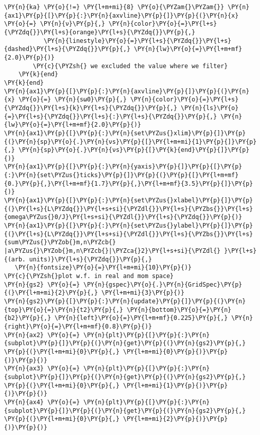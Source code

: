 \begin{Verbatim}[commandchars=\\\{\}]
        \PY{n}{ka} \PY{o}{!=} \PY{l+m+mi}{8} \PY{o}{\PYZam{}\PYZam{}} \PY{n}{ax1}\PY{p}{[}\PY{p}{:}\PY{n}{axvline}\PY{p}{]}\PY{p}{(}\PY{n}{x} \PY{o}{=} \PY{n}{ν}\PY{p}{,} \PY{n}{color}\PY{o}{=}\PY{l+s}{\PYZdq{}}\PY{l+s}{orange}\PY{l+s}{\PYZdq{}}\PY{p}{,}
           \PY{n}{linestyle}\PY{o}{=}\PY{l+s}{\PYZdq{}}\PY{l+s}{dashed}\PY{l+s}{\PYZdq{}}\PY{p}{,} \PY{n}{lw}\PY{o}{=}\PY{l+m+mf}{2.0}\PY{p}{)}
        \PY{c}{\PYZsh{} we excluded the value where we filter}
    \PY{k}{end}
\PY{k}{end}
\PY{n}{ax1}\PY{p}{[}\PY{p}{:}\PY{n}{axvline}\PY{p}{]}\PY{p}{(}\PY{n}{x} \PY{o}{=} \PY{n}{sω0}\PY{p}{,} \PY{n}{color}\PY{o}{=}\PY{l+s}{\PYZdq{}}\PY{l+s}{k}\PY{l+s}{\PYZdq{}}\PY{p}{,} \PY{n}{ls}\PY{o}{=}\PY{l+s}{\PYZdq{}}\PY{l+s}{:}\PY{l+s}{\PYZdq{}}\PY{p}{,} \PY{n}{lw}\PY{o}{=}\PY{l+m+mf}{2.0}\PY{p}{)}
\PY{n}{ax1}\PY{p}{[}\PY{p}{:}\PY{n}{set\PYZus{}xlim}\PY{p}{]}\PY{p}{(}\PY{n}{sp}\PY{o}{.}\PY{n}{νs}\PY{p}{[}\PY{l+m+mi}{1}\PY{p}{]}\PY{p}{,} \PY{n}{sp}\PY{o}{.}\PY{n}{νs}\PY{p}{[}\PY{k}{end}\PY{p}{]}\PY{p}{)}
\PY{n}{ax1}\PY{p}{[}\PY{p}{:}\PY{n}{yaxis}\PY{p}{]}\PY{p}{[}\PY{p}{:}\PY{n}{set\PYZus{}ticks}\PY{p}{]}\PY{p}{(}\PY{p}{[}\PY{l+m+mf}{0.}\PY{p}{,}\PY{l+m+mf}{1.7}\PY{p}{,}\PY{l+m+mf}{3.5}\PY{p}{]}\PY{p}{)}
\PY{n}{ax1}\PY{p}{[}\PY{p}{:}\PY{n}{set\PYZus{}xlabel}\PY{p}{]}\PY{p}{(}\PY{l+s}{L\PYZdq{}}\PY{l+s+si}{\PYZdl{}}\PY{l+s}{\PYZbs{}}\PY{l+s}{omega\PYZus{}0/J}\PY{l+s+si}{\PYZdl{}}\PY{l+s}{\PYZdq{}}\PY{p}{)}
\PY{n}{ax1}\PY{p}{[}\PY{p}{:}\PY{n}{set\PYZus{}ylabel}\PY{p}{]}\PY{p}{(}\PY{l+s}{L\PYZdq{}}\PY{l+s+si}{\PYZdl{}}\PY{l+s}{\PYZbs{}}\PY{l+s}{sum\PYZus{}\PYZob{}m,n\PYZcb{} |a\PYZus{}\PYZob{}m,n\PYZcb{}|\PYZca{}2}\PY{l+s+si}{\PYZdl{} }\PY{l+s}{(arb. units)}\PY{l+s}{\PYZdq{}}\PY{p}{,}
   \PY{n}{fontsize}\PY{o}{=}\PY{l+m+mi}{10}\PY{p}{)}
\PY{c}{\PYZsh{}plot w.f. in real and mom space}
\PY{n}{gs2} \PY{o}{=} \PY{n}{gspec}\PY{o}{.}\PY{n}{GridSpec}\PY{p}{(}\PY{l+m+mi}{2}\PY{p}{,} \PY{l+m+mi}{3}\PY{p}{)}
\PY{n}{gs2}\PY{p}{[}\PY{p}{:}\PY{n}{update}\PY{p}{]}\PY{p}{(}\PY{n}{top}\PY{o}{=}\PY{n}{t2}\PY{p}{,} \PY{n}{bottom}\PY{o}{=}\PY{n}{b2}\PY{p}{,} \PY{n}{left}\PY{o}{=}\PY{l+m+mf}{0.225}\PY{p}{,} \PY{n}{right}\PY{o}{=}\PY{l+m+mf}{0.8}\PY{p}{)}
\PY{n}{ax2} \PY{o}{=} \PY{n}{plt}\PY{p}{[}\PY{p}{:}\PY{n}{subplot}\PY{p}{]}\PY{p}{(}\PY{n}{get}\PY{p}{(}\PY{n}{gs2}\PY{p}{,} \PY{p}{(}\PY{l+m+mi}{0}\PY{p}{,} \PY{l+m+mi}{0}\PY{p}{)}\PY{p}{)}\PY{p}{)}
\PY{n}{ax3} \PY{o}{=} \PY{n}{plt}\PY{p}{[}\PY{p}{:}\PY{n}{subplot}\PY{p}{]}\PY{p}{(}\PY{n}{get}\PY{p}{(}\PY{n}{gs2}\PY{p}{,} \PY{p}{(}\PY{l+m+mi}{0}\PY{p}{,} \PY{l+m+mi}{1}\PY{p}{)}\PY{p}{)}\PY{p}{)}
\PY{n}{ax4} \PY{o}{=} \PY{n}{plt}\PY{p}{[}\PY{p}{:}\PY{n}{subplot}\PY{p}{]}\PY{p}{(}\PY{n}{get}\PY{p}{(}\PY{n}{gs2}\PY{p}{,} \PY{p}{(}\PY{l+m+mi}{0}\PY{p}{,} \PY{l+m+mi}{2}\PY{p}{)}\PY{p}{)}\PY{p}{)}

\end{Verbatim}
